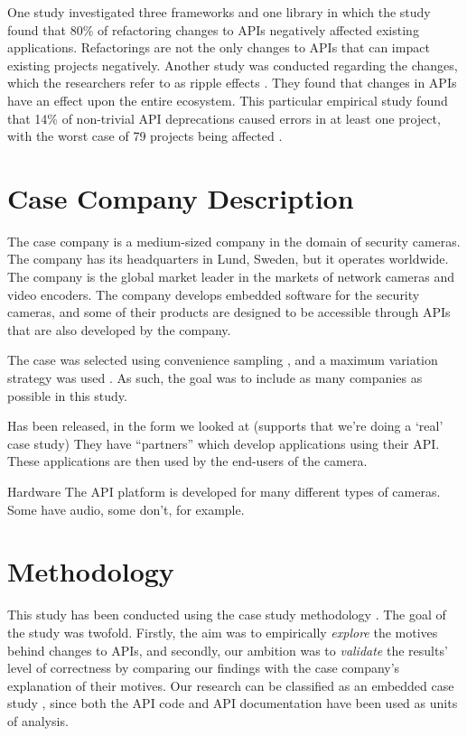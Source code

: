 \documentclass[conference]{IEEEtran}
\begin{document}
One study \cite{dig2005role} investigated three frameworks and one library in which the study found that 80\% of refactoring changes to APIs negatively affected existing applications. Refactorings are not the only changes to APIs that can impact existing projects negatively. Another study was conducted regarding the changes, which the researchers refer to as ripple effects \cite{robbes2012developers}. They found that changes in APIs have an effect upon the entire ecosystem. This particular empirical study found that 14\% of non-trivial API deprecations caused errors in at least one project, with the worst case of 79 projects being affected \cite{robbes2012developers}.


\section{Case Company Description} \label{case_company_description}
The case company is a medium-sized company in the domain of security cameras. The company has its headquarters in Lund, Sweden, but it operates worldwide. The company is the global market leader in the markets of network cameras and video encoders. The company develops embedded software for the security cameras, and some of their products are designed to be accessible through APIs that are also developed by the company. 


The case was selected using convenience sampling \cite{flyvbjerg2006five}, and a maximum variation strategy was used \cite{benbasat1987case}. As such, the goal was to include as many companies as possible in this study.


Has been released, in the form we looked at (supports that we’re doing a ‘real’ case study)
They have “partners” which develop applications using their API. These applications are then used by the end-users of the camera. 

Hardware
The API platform is developed for many different types of cameras. 
Some have audio, some don’t, for example.



\section{Methodology} \label{methodology}
This study has been conducted using the case study methodology \cite{runeson2009guidelines}. The goal of the study was twofold. Firstly, the aim was to empirically \textit{explore} the motives behind changes to APIs, and secondly, our ambition was to \textit{validate} the results' level of correctness by comparing our findings with the case company's explanation of their motives. Our research can be classified as an embedded case study \cite{yin2013case}, since both the API code and API documentation have been used as units of analysis. 
\end{document}
